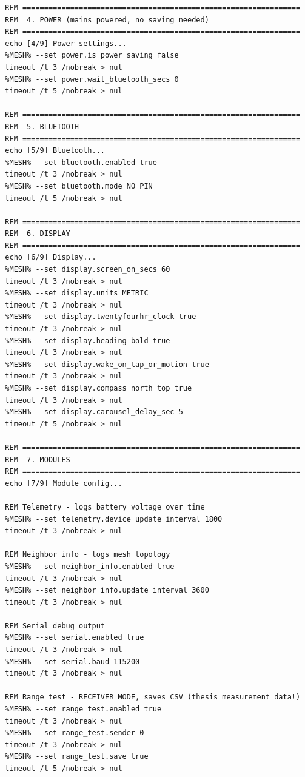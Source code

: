 \begin{verbatim}
  REM ================================================================
  REM  4. POWER (mains powered, no saving needed)
  REM ================================================================
  echo [4/9] Power settings...
  %MESH% --set power.is_power_saving false
  timeout /t 3 /nobreak > nul
  %MESH% --set power.wait_bluetooth_secs 0
  timeout /t 5 /nobreak > nul

  REM ================================================================
  REM  5. BLUETOOTH
  REM ================================================================
  echo [5/9] Bluetooth...
  %MESH% --set bluetooth.enabled true
  timeout /t 3 /nobreak > nul
  %MESH% --set bluetooth.mode NO_PIN
  timeout /t 5 /nobreak > nul

  REM ================================================================
  REM  6. DISPLAY
  REM ================================================================
  echo [6/9] Display...
  %MESH% --set display.screen_on_secs 60
  timeout /t 3 /nobreak > nul
  %MESH% --set display.units METRIC
  timeout /t 3 /nobreak > nul
  %MESH% --set display.twentyfourhr_clock true
  timeout /t 3 /nobreak > nul
  %MESH% --set display.heading_bold true
  timeout /t 3 /nobreak > nul
  %MESH% --set display.wake_on_tap_or_motion true
  timeout /t 3 /nobreak > nul
  %MESH% --set display.compass_north_top true
  timeout /t 3 /nobreak > nul
  %MESH% --set display.carousel_delay_sec 5
  timeout /t 5 /nobreak > nul

  REM ================================================================
  REM  7. MODULES
  REM ================================================================
  echo [7/9] Module config...

  REM Telemetry - logs battery voltage over time
  %MESH% --set telemetry.device_update_interval 1800
  timeout /t 3 /nobreak > nul

  REM Neighbor info - logs mesh topology
  %MESH% --set neighbor_info.enabled true
  timeout /t 3 /nobreak > nul
  %MESH% --set neighbor_info.update_interval 3600
  timeout /t 3 /nobreak > nul

  REM Serial debug output
  %MESH% --set serial.enabled true
  timeout /t 3 /nobreak > nul
  %MESH% --set serial.baud 115200
  timeout /t 3 /nobreak > nul

  REM Range test - RECEIVER MODE, saves CSV (thesis measurement data!)
  %MESH% --set range_test.enabled true
  timeout /t 3 /nobreak > nul
  %MESH% --set range_test.sender 0
  timeout /t 3 /nobreak > nul
  %MESH% --set range_test.save true
  timeout /t 5 /nobreak > nul


\end{verbatim}
